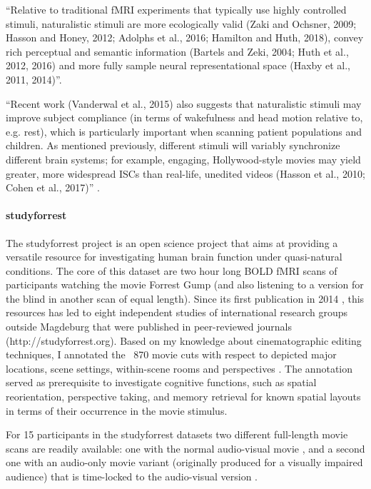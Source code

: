 ``Relative to traditional fMRI experiments that typically use highly controlled
stimuli, naturalistic stimuli are more ecologically valid (Zaki and Ochsner,
2009; Hasson and Honey, 2012; Adolphs et al., 2016; Hamilton and Huth, 2018),
convey rich perceptual and semantic information (Bartels and Zeki, 2004; Huth et
al., 2012, 2016) and more fully sample neural representational space (Haxby et
al., 2011, 2014)''\citep{nastase2019measuring}.

``Recent work (Vanderwal et al., 2015) also suggests that naturalistic stimuli
may improve subject compliance (in terms of wakefulness and head motion relative
to, e.g. rest), which is particularly important when scanning patient
populations and children. As mentioned previously, different stimuli will
variably synchronize different brain systems; for example, engaging,
Hollywood-style movies may yield greater, more widespread ISCs than real-life,
unedited videos (Hasson et al., 2010; Cohen et al., 2017)''
\citep{nastase2019measuring}.



\paragraph{studyforrest}
%
The studyforrest project is an open science project that aims at providing a
versatile resource for investigating human brain function under quasi-natural
conditions.
%
The core of this dataset are two hour long BOLD fMRI scans of participants
watching the movie Forrest Gump (and also listening to a version for the blind
in another scan of equal length).
%
Since its first publication in 2014 \citep{hanke2014audiomovie}, this resources
has led to eight independent studies of international research groups outside
Magdeburg that were published in peer-reviewed journals
(http://studyforrest.org).
%
Based on my knowledge about cinematographic editing techniques, I annotated the
~870 movie cuts with respect to depicted major locations, scene settings,
within-scene rooms and perspectives \citep{haeusler2016cutanno}.
%
The annotation served as prerequisite to investigate cognitive functions, such
as spatial reorientation, perspective taking, and memory retrieval for known
spatial layouts in terms of their occurrence in the movie stimulus.

For 15 participants in the studyforrest datasets two different full-length movie
scans are readily available: one with the normal audio-visual movie
\citep{hanke2016simultaneous}, and a second one with an audio-only movie variant
(originally produced for a visually impaired audience) that is time-locked to
the audio-visual version \citep{hanke2014audiomovie}.



